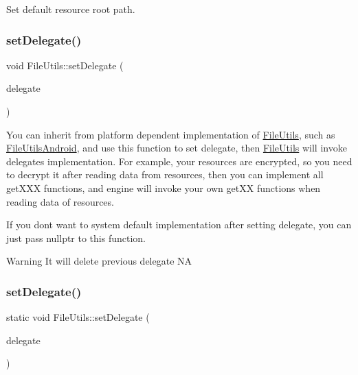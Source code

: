 Set default resource root path. \mbox{\label{classFileUtils_a912337c1295de714a304af0f61a0ebe0}} 
\subsubsection{\texorpdfstring{set\+Delegate()}{setDelegate()}\hspace{0.1cm}{\footnotesize\ttfamily [1/2]}}
{\footnotesize\ttfamily void File\+Utils\+::set\+Delegate (\begin{DoxyParamCaption}\item[{\hyperlink{classFileUtils}{File\+Utils} $\ast$}]{delegate }\end{DoxyParamCaption})\hspace{0.3cm}{\ttfamily [static]}}

You can inherit from platform dependent implementation of \hyperlink{classFileUtils}{File\+Utils}, such as \hyperlink{classFileUtilsAndroid}{File\+Utils\+Android}, and use this function to set delegate, then \hyperlink{classFileUtils}{File\+Utils} will invoke delegate\textquotesingle{}s implementation. For example, your resources are encrypted, so you need to decrypt it after reading data from resources, then you can implement all get\+X\+XX functions, and engine will invoke your own get\+XX functions when reading data of resources.

If you don\textquotesingle{}t want to system default implementation after setting delegate, you can just pass nullptr to this function.

\begin{DoxyWarning}{Warning}
It will delete previous delegate  NA 
\end{DoxyWarning}
\mbox{\label{classFileUtils_aa53a6facb5bf6d418d71a9b8503a0756}} 
\subsubsection{\texorpdfstring{set\+Delegate()}{setDelegate()}\hspace{0.1cm}{\footnotesize\ttfamily [2/2]}}
{\footnotesize\ttfamily static void File\+Utils\+::set\+Delegate (\begin{DoxyParamCaption}\item[{\hyperlink{classFileUtils}{File\+Utils} $\ast$}]{delegate }\end{DoxyParamCaption})\hspace{0.3cm}{\ttfamily [static]}}

